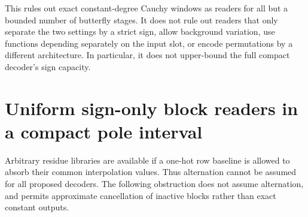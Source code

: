 \documentclass[11pt]{article}
\begin{document}
This rules out exact constant-degree Cauchy windows as readers for all
but a bounded number of butterfly stages. It does not rule out readers
that only separate the two settings by a strict sign, allow background
variation, use functions depending separately on the input slot, or
encode permutations by a different architecture. In particular, it
does not upper-bound the full compact decoder's sign capacity.

\section{Uniform sign-only block readers in a compact pole interval}
Arbitrary residue libraries are available if a one-hot row baseline is
allowed to absorb their common interpolation values. Thus alternation
cannot be assumed for all proposed decoders. The following obstruction
does not assume alternation, and permits approximate cancellation of
inactive blocks rather than exact constant outputs.
\end{document}
